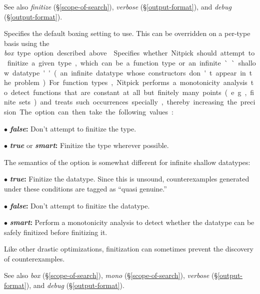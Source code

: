 \documentclass[a4paper,12pt]{article}
\begin{document}
\begin{enum}
\nopagebreak
{\small See also \textit{finitize} (\S\ref{scope-of-search}), \textit{verbose}
(\S\ref{output-format}), and \textit{debug} (\S\ref{output-format}).}

Specifies the default boxing setting to use. This can be overridden on a
per-type basis using the \textit{box}~\qty{type} option described above.

Specifies whether Nitpick should attempt to finitize a given type, which can be
a function type or an infinite ``shallow datatype'' (an infinite datatype whose
constructors don't appear in the problem).

For function types, Nitpick performs a monotonicity analysis to detect functions
that are constant at all but finitely many points (e.g., finite sets) and treats
such occurrences specially, thereby increasing the precision. The option can
then take the following values:

\begin{enum}
\item[$\bullet$] \textbf{\textit{false}:} Don't attempt to finitize the type.
\item[$\bullet$] \textbf{\textit{true}} or \textbf{\textit{smart}:} Finitize the
type wherever possible.
\end{enum}

The semantics of the option is somewhat different for infinite shallow
datatypes:

\begin{enum}
\item[$\bullet$] \textbf{\textit{true}:} Finitize the datatype. Since this is
unsound, counterexamples generated under these conditions are tagged as ``quasi
genuine.''
\item[$\bullet$] \textbf{\textit{false}:} Don't attempt to finitize the datatype.
\item[$\bullet$] \textbf{\textit{smart}:} Perform a monotonicity analysis to
detect whether the datatype can be safely finitized before finitizing it.
\end{enum}

Like other drastic optimizations, finitization can sometimes prevent the
discovery of counterexamples.

\nopagebreak
{\small See also \textit{box} (\S\ref{scope-of-search}), \textit{mono}
(\S\ref{scope-of-search}), \textit{verbose} (\S\ref{output-format}), and
\textit{debug} (\S\ref{output-format}).}


\end{enum}
\end{document}
